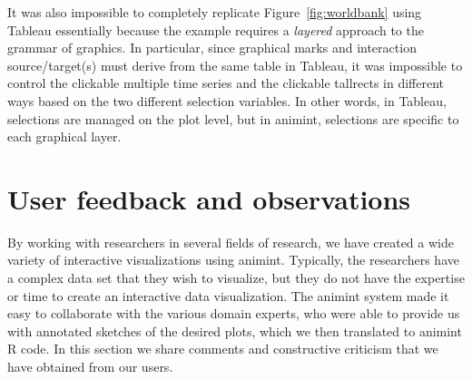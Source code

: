 \documentclass[12pt]{article}\usepackage[]{graphicx}\usepackage[]{color}
\begin{document}
%
%



It was also impossible to completely replicate Figure~\ref{fig:worldbank}
using Tableau essentially because the example requires a \emph{layered} 
approach to the grammar of graphics. In particular, since graphical
marks and interaction source/target(s) must derive from the same table
in Tableau, it was impossible to control the clickable multiple time 
series and the clickable tallrects in different ways based on the two 
different selection variables. In other words, in Tableau, selections 
are managed on the plot level, but in animint, selections are specific
to each graphical layer.

\section{User feedback and observations}

By working with researchers in several fields of research,
we have created a wide variety of
interactive visualizations using animint.
Typically, the researchers have a complex data set that
they wish to visualize,
but they do not have the expertise or time to create
an interactive data visualization.
The animint system made it easy to collaborate with the various domain experts,
who were able to provide us with annotated sketches of the desired plots,
which we then translated to animint R code.
In this section we share comments and
constructive criticism that we have obtained from our users.
\end{document}

